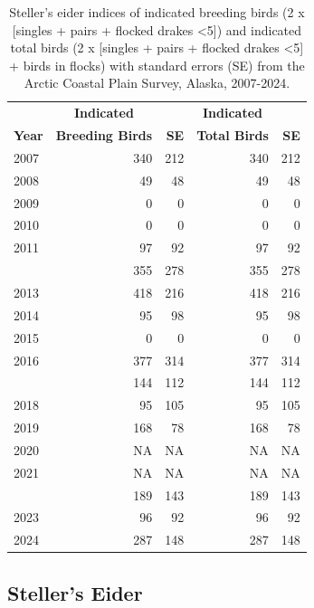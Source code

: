 \documentclass[
]{article}
\begin{document}
\begin{longtable}[t]{lrrrr}

\caption{\label{tbl-STEI}Steller's eider indices of indicated breeding
birds (2 x {[}singles + pairs + flocked drakes \textless5{]}) and
indicated total birds (2 x {[}singles + pairs + flocked drakes
\textless5{]} + birds in flocks) with standard errors (SE) from the
Arctic Coastal Plain Survey, Alaska, 2007-2024.}

\tabularnewline

\\
\toprule
\multicolumn{1}{c}{\textbf{ }} & \multicolumn{1}{c}{\textbf{Indicated}} & \multicolumn{1}{c}{\textbf{ }} & \multicolumn{1}{c}{\textbf{Indicated}} & \multicolumn{1}{c}{\textbf{ }} \\
\cmidrule(l{3pt}r{3pt}){2-2} \cmidrule(l{3pt}r{3pt}){4-4}
\textbf{Year} & \textbf{Breeding Birds} & \textbf{SE} & \textbf{Total Birds} & \textbf{SE}\\
\midrule
2007 & 340 & 212 & 340 & 212\\
2008 & 49 & 48 & 49 & 48\\
2009 & 0 & 0 & 0 & 0\\
2010 & 0 & 0 & 0 & 0\\
2011 & 97 & 92 & 97 & 92\\
\addlinespace
2012 & 355 & 278 & 355 & 278\\
2013 & 418 & 216 & 418 & 216\\
2014 & 95 & 98 & 95 & 98\\
2015 & 0 & 0 & 0 & 0\\
2016 & 377 & 314 & 377 & 314\\
\addlinespace
2017 & 144 & 112 & 144 & 112\\
2018 & 95 & 105 & 95 & 105\\
2019 & 168 & 78 & 168 & 78\\
2020 & NA & NA & NA & NA\\
2021 & NA & NA & NA & NA\\
\addlinespace
2022 & 189 & 143 & 189 & 143\\
2023 & 96 & 92 & 96 & 92\\
2024 & 287 & 148 & 287 & 148\\
\bottomrule

\end{longtable}

\endgroup{}

\newpage{}

\subsection*{Steller's Eider}\label{stellers-eider-2}
\end{document}
